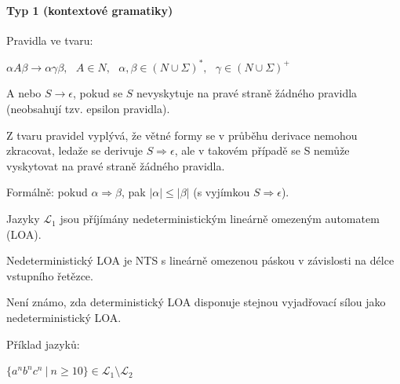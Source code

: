 \paragraph*{Typ 1 (kontextové gramatiky)} \begin{compactitem}
    \item Pravidla ve tvaru: \begin{compactitem}
        \item $\alpha A \beta \rightarrow \alpha \gamma \beta,~~~ A \in N,~~~ \alpha, \beta \in (N \cup \Sigma)^*,~~~ \gamma \in (N \cup \Sigma)^+$
        \item A nebo $S \rightarrow \epsilon$, pokud se $S$ nevyskytuje na pravé straně žádného pravidla (neobsahují tzv. epsilon pravidla).
        \item Z tvaru pravidel vyplývá, že větné formy se v průběhu derivace nemohou zkracovat, ledaže se derivuje $S \Rightarrow \epsilon$, ale v takovém případě se S nemůže vyskytovat na pravé straně žádného pravidla.
        \item Formálně: pokud $\alpha \Rightarrow \beta$, pak $|\alpha| \leq |\beta|$ (s vyjímkou $S \Rightarrow \epsilon$).
    \end{compactitem}

    \item Jazyky $\mathcal{L}_1$ jsou příjímány nedeterministickým lineárně omezeným automatem (LOA). \begin{compactitem}
        \item Nedeterministický LOA je NTS s lineárně omezenou páskou v závislosti na délce vstupního řetězce.
        \item Není známo, zda deterministický LOA disponuje stejnou vyjadřovací sílou jako nedeterministický LOA.
    \end{compactitem}

    \item Příklad jazyků: \begin{compactitem}
        \item $\{ a^n b^n c^n ~|~ n \geq 10 \} \in \mathcal{L}_1 \setminus \mathcal{L}_2$
    \end{compactitem}
\end{compactitem}

